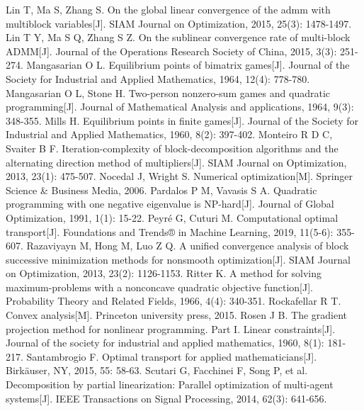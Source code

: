 \documentclass[UTF8,10.5pt,a4paper]{ctexart}
\theoremstyle{definition}
\theoremstyle{definition}
\begin{document}
\begin{thebibliography}{MM}
\begin{small}
		 Lin T, Ma S, Zhang S. On the global linear convergence of the admm with multiblock variables[J]. SIAM Journal on Optimization, 2015, 25(3): 1478-1497.
		 Lin T Y, Ma S Q, Zhang S Z. On the sublinear convergence rate of multi-block ADMM[J]. Journal of the Operations Research Society of China, 2015, 3(3): 251-274.
		 Mangasarian O L. Equilibrium points of bimatrix games[J]. Journal of the Society for Industrial and Applied Mathematics, 1964, 12(4): 778-780.
		 Mangasarian O L, Stone H. Two-person nonzero-sum games and quadratic programming[J]. Journal of Mathematical Analysis and applications, 1964, 9(3): 348-355.
		 Mills H. Equilibrium points in finite games[J]. Journal of the Society for Industrial and Applied Mathematics, 1960, 8(2): 397-402.
		 Monteiro R D C, Svaiter B F. Iteration-complexity of block-decomposition algorithms and the alternating direction method of multipliers[J]. SIAM Journal on Optimization, 2013, 23(1): 475-507.
		 Nocedal J, Wright S. Numerical optimization[M]. Springer Science \& Business Media, 2006.
		 Pardalos P M, Vavasis S A. Quadratic programming with one negative eigenvalue is NP-hard[J]. Journal of Global Optimization, 1991, 1(1): 15-22.
		 Peyré G, Cuturi M. Computational optimal transport[J]. Foundations and Trends® in Machine Learning, 2019, 11(5-6): 355-607.
		 Razaviyayn M, Hong M, Luo Z Q. A unified convergence analysis of block successive minimization methods for nonsmooth optimization[J]. SIAM Journal on Optimization, 2013, 23(2): 1126-1153.
		 Ritter K. A method for solving maximum-problems with a nonconcave quadratic objective function[J]. Probability Theory and Related Fields, 1966, 4(4): 340-351.
		 Rockafellar R T. Convex analysis[M]. Princeton university press, 2015.
		 Rosen J B. The gradient projection method for nonlinear programming. Part I. Linear constraints[J]. Journal of the society for industrial and applied mathematics, 1960, 8(1): 181-217.
		 Santambrogio F. Optimal transport for applied mathematicians[J]. Birkäuser, NY, 2015, 55: 58-63.
		 Scutari G, Facchinei F, Song P, et al. Decomposition by partial linearization: Parallel optimization of multi-agent systems[J]. IEEE Transactions on Signal Processing, 2014, 62(3): 641-656.

\end{small}
\end{thebibliography}
\end{document}
